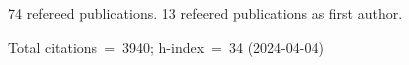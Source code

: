 74 refereed publications. 13 refeered publications as first author.

Total citations~=~3940; h-index~=~34 (2024-04-04)